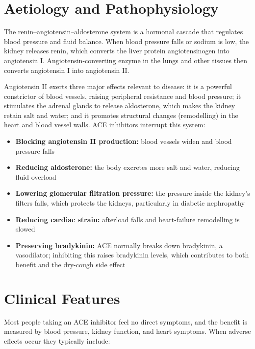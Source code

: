 \section*{Aetiology and Pathophysiology}
The renin--angiotensin--aldosterone system is a hormonal cascade that regulates blood pressure and fluid balance. When blood pressure falls or sodium is low, the kidney releases renin, which converts the liver protein angiotensinogen into angiotensin I. Angiotensin-converting enzyme in the lungs and other tissues then converts angiotensin I into angiotensin II.

Angiotensin II exerts three major effects relevant to disease: it is a powerful constrictor of blood vessels, raising peripheral resistance and blood pressure; it stimulates the adrenal glands to release aldosterone, which makes the kidney retain salt and water; and it promotes structural changes (remodelling) in the heart and blood vessel walls. ACE inhibitors interrupt this system:

\begin{itemize}
    \item \textbf{Blocking angiotensin II production:} blood vessels widen and blood pressure falls
    \item \textbf{Reducing aldosterone:} the body excretes more salt and water, reducing fluid overload
    \item \textbf{Lowering glomerular filtration pressure:} the pressure inside the kidney's filters falls, which protects the kidneys, particularly in diabetic nephropathy
    \item \textbf{Reducing cardiac strain:} afterload falls and heart-failure remodelling is slowed
    \item \textbf{Preserving bradykinin:} ACE normally breaks down bradykinin, a vasodilator; inhibiting this raises bradykinin levels, which contributes to both benefit and the dry-cough side effect
\end{itemize}

\section*{Clinical Features}
Most people taking an ACE inhibitor feel no direct symptoms, and the benefit is measured by blood pressure, kidney function, and heart symptoms. When adverse effects occur they typically include:

